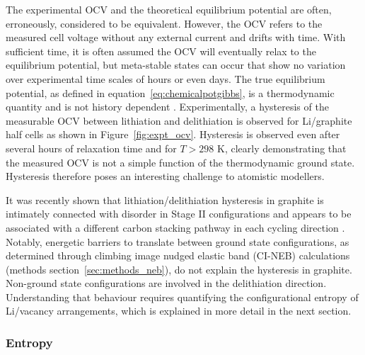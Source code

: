 \documentclass[../main.tex]{subfiles}
\begin{document}
The experimental OCV and the theoretical equilibrium potential are often, erroneously, considered to be equivalent. However, the OCV refers to the measured cell voltage without any external current and drifts with time. With sufficient time, it is often assumed the OCV will eventually relax to the equilibrium potential, but meta-stable states can occur that show no variation over experimental time scales of hours or even days.\cite{Liu2014,orisaka2013,Mercer2021} The true equilibrium potential, as defined in equation~\ref{eq:chemicalpotgibbs}, is a thermodynamic quantity and is not history dependent \cite{VanderVen2020,Mercer2021}. Experimentally, a hysteresis of the measurable OCV between lithiation and delithiation is observed for Li/graphite half cells \cite{Ohzuku1993,Zheng1995,Dahn1991,Allart2018,Gallagher2012,Yazami_2006,GRIMSMANN201817,didier2020,Mercer2021} as shown in Figure~\ref{fig:expt_ocv}. Hysteresis is observed even after several hours of relaxation time and for $T>298$ K, clearly demonstrating that the measured OCV is not a simple function of the thermodynamic ground state. Hysteresis therefore poses an interesting challenge to atomistic modellers.

It was recently shown that lithiation/delithiation hysteresis in graphite is intimately connected with disorder in Stage II configurations and appears to be associated with a different carbon stacking pathway in each cycling direction \cite{Mercer2021}. Notably, energetic barriers to translate between ground state configurations, as determined through climbing image nudged elastic band (CI-NEB) calculations (methods section~\ref{sec:methods_neb}), do not explain the hysteresis in graphite. Non-ground state configurations are involved in the delithiation direction. Understanding that behaviour requires quantifying the configurational entropy of Li/vacancy arrangements, which is explained in more detail in the next section.  

\subsubsection{Entropy}
\label{sec:anodes_entropy}
\end{document}
